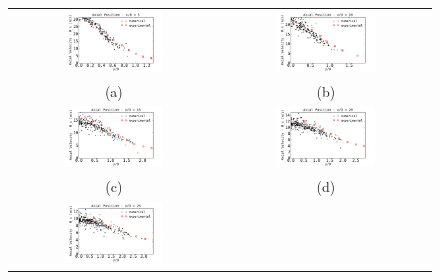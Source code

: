 \documentclass[preprint,12pt,review]{elsarticle}
\begin{document}
\begin{figure}[!htb]
 \centering
\begin{tabular}{cc}
 \includegraphics[width=0.5\textwidth]{../thesis/figuras/chap5/Ux/Ux_drops/Ux_x5.png} & \includegraphics[width=0.5\textwidth]{../thesis/figuras/chap5/Ux/Ux_drops/Ux_x10.png} \\
(a) & (b) \\
\includegraphics[width=0.5\textwidth]{../thesis/figuras/chap5/Ux/Ux_drops/Ux_x15.png} & \includegraphics[width=0.5\textwidth]{../thesis/figuras/chap5/Ux/Ux_drops/Ux_x20.png} \\
(c) & (d) \\
\includegraphics[width=0.5\textwidth]{../thesis/figuras/chap5/Ux/Ux_drops/Ux_x25.png} &   \\

\end{tabular}
\end{figure}
\end{document}
